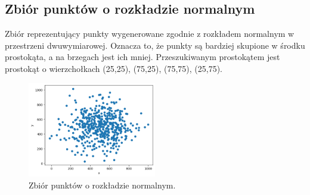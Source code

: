 \documentclass{lab}
\begin{document}
\subsection{Zbiór punktów o rozkładzie normalnym}
Zbiór reprezentujący punkty wygenerowane zgodnie z rozkładem normalnym w przestrzeni dwuwymiarowej.
Oznacza to, że punkty są bardziej skupione w środku prostokąta, a na brzegach jest ich mniej.
Przeszukiwanym prostokątem jest prostokąt o wierzchołkach (25,25), (75,25), (75,75), (25,75).

\begin{figure}[H]
  \centering
  \includegraphics[width=0.5\textwidth]{resources/normal.png}
  \caption{Zbiór punktów o rozkładzie normalnym.}
  \label{fig:normal}
\end{figure}
\end{document}
